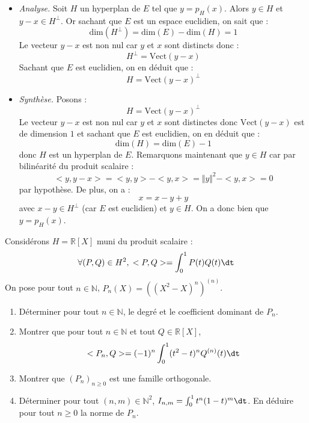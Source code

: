 \documentclass[a4paper,10pt]{report}
\begin{document}
 \begin{itemize}
 \item \textit{Analyse.} Soit $H$ un hyperplan de $E$ tel que $y = p_{H}(x)$. Alors $y \in H$ et $y-x \in H^{\perp}$. Or sachant que $E$ est un espace euclidien, on sait que :
 $$ \textrm{dim}(H^{\perp})= \textrm{dim}(E) - \textrm{dim}(H)=1$$
 Le vecteur $y-x$ est non nul car $y$ et $x$ sont distincts donc :
 $$ H^{\perp}= \textrm{Vect}(y-x)$$
 Sachant que $E$ est euclidien, on en déduit que :
 $$ H = \textrm{Vect}(y-x)^{\perp}$$
 \item \textit{Synthèse.} Posons :
 $$ H = \textrm{Vect}(y-x)^{\perp}$$
 Le vecteur $y-x$ est non nul car $y$ et $x$ sont distinctes donc $ \textrm{Vect}(y-x)$ est de dimension $1$ et sachant que $E$ est euclidien, on en déduit que :
 $$ \textrm{dim}(H) = \textrm{dim}(E) - 1 $$
 donc $H$ est un hyperplan de $E$. Remarquons maintenant que $y \in H$ car par bilinéarité du produit scalaire :
 $$ <y,y-x> = <y,y>-<y,x>= \Vert y \Vert^2 - <y,x>= 0$$
 par hypothèse. De plus, on a :
 $$ x=x-y+y$$
 avec $x-y \in H^{\perp}$ (car $E$ est euclidien) et $y \in H$. On a donc bien que $y = p_H(x)$.
\end{itemize}

\begin{Exa} Considérons $H= \mathbb{R}[X]$ muni du produit scalaire :
$$ \forall (P,Q) \in H^2, \; <P,Q> = \int_{0}^1 P(t) Q(t) \dt $$
On pose pour tout $n \in \mathbb{N}$, $P_n(X)= ((X^2-X)^n)^{(n)}$.

\begin{enumerate}
\item Déterminer pour tout $n \in \mathbb{N}$, le degré et le coefficient dominant de $P_n$.
\item Montrer que pour tout $n \in \mathbb{N}$ et tout $Q \in \mathbb{R}[X]$,
$$ <P_n,Q> = (-1)^n \int_{0}^1 (t^2-t)^n Q^{(n)}(t) \dt $$
\item Montrer que $(P_n)_{n \geq 0}$ est une famille orthogonale.
\item Déterminer pour tout $(n,m) \in \mathbb{N}^2$, $I_{n,m} = \int_{0}^1 t^n(1-t)^m \dt$. En déduire pour tout $n \geq 0$ la norme de $P_n$.
\end{enumerate}
\end{Exa}

\corr 
\end{document}

